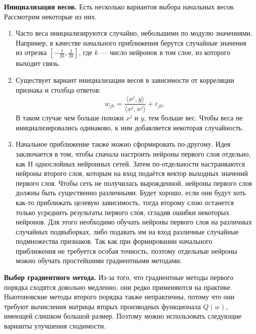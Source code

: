 \documentclass{article}
\begin{document}
	\textbf{Инициализация весов.} 
	Есть несколько вариантов выбора начальных весов. Рассмотрим некоторые из них.
	\begin{enumerate}
		\item Часто веса инициализируются случайно, небольшими по модулю значениями. Например, в качестве начального приближения берутся случайные значения из отрезка $[-\frac{1}{2k}, \frac{1}{2k}]$, где $k$ --- число нейронов в том слое, из которого выходит связь.
		\item Существует вариант инициализации весов в зависимости от корреляции признака и столбца ответов:
		\begin{equation*}
			w_{jh}=\frac{\langle x^j, y\rangle}{\langle x^j, x^j\rangle} + \varepsilon_{jh}.
		\end{equation*}
		В таком случае чем больше похожи $x^j$ и $y$, тем больше вес. Чтобы веса не инициализировались одинаково, к ним добавляется некоторая случайность. 
		
		\item Начальное приближение также можно сформировать по-другому. Идея заключается в том, чтобы сначала настроить нейроны первого слоя отдельно, как H однослойных нейронных сетей. Затем по-отдельности настраиваются нейроны второго слоя, которым на вход подаётся вектор выходных значений первого слоя. Чтобы сеть не получилась вырожденной, нейроны первого слоя должны быть существенно различными. Будет хорошо, если они будут хоть как-то приближать целевую зависимость, тогда второму слою останется только усреднить результаты первого слоя, сгладив ошибки некоторых нейронов. Для этого необходимо обучать нейроны первого слоя на различных случайных подвыборках, либо подавать им на вход различные случайные подмножества признаков. Так как при формировании начального приближения не требуется особая точность, поэтому отдельные нейроны можно обучать простейшими градиентными методами.
		
	\end{enumerate}
	
	\textbf{Выбор градиентного метода.} Из-за того, что градиентные методы первого порядка сходятся довольно медленно, они редко применяются на практике. Ньютоновские методы второго порядка также непрактичны, потому что они требуют вычисления матрицы вторых производных функционала $Q(w)$, имеющей слишком большой размер. Поэтому можно использовать следующие варианты улучшения сходимости.
	
\end{document}
